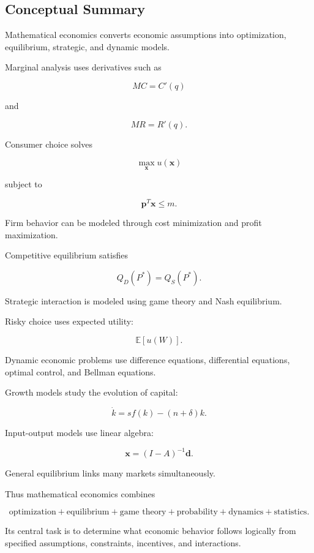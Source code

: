 \subsection{Conceptual Summary}
\label{subsec:mathematical-economics-summary}

Mathematical economics converts economic assumptions into optimization,
equilibrium, strategic, and dynamic models.

Marginal analysis uses derivatives such as

\[
\boxed{
MC=C'(q)
}
\]

and

\[
\boxed{
MR=R'(q).
}
\]

Consumer choice solves

\[
\boxed{
\max_{\mathbf{x}}
u(\mathbf{x})
}
\]

subject to

\[
\boxed{
\mathbf{p}^T\mathbf{x}\leq m.
}
\]

Firm behavior can be modeled through cost minimization and profit
maximization.

Competitive equilibrium satisfies

\[
\boxed{
Q_D(P^*)=Q_S(P^*).
}
\]

Strategic interaction is modeled using game theory and Nash equilibrium.

Risky choice uses expected utility:

\[
\boxed{
\mathbb{E}[u(W)].
}
\]

Dynamic economic problems use difference equations, differential equations,
optimal control, and Bellman equations.

Growth models study the evolution of capital:

\[
\boxed{
\dot{k}
=
sf(k)-(n+\delta)k.
}
\]

Input-output models use linear algebra:

\[
\boxed{
\mathbf{x}
=
(I-A)^{-1}\mathbf{d}.
}
\]

General equilibrium links many markets simultaneously.

Thus mathematical economics combines

\[
\boxed{
\text{optimization}
+
\text{equilibrium}
+
\text{game theory}
+
\text{probability}
+
\text{dynamics}
+
\text{statistics}.
}
\]

Its central task is to determine what economic behavior follows logically
from specified assumptions, constraints, incentives, and interactions.

